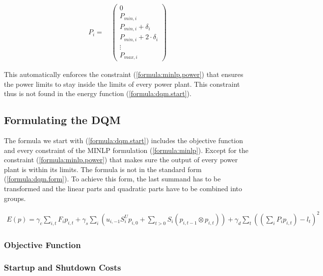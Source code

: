\begin{align}
  P_i =
  \quad \begin{pmatrix}
    0 \\
    P_{min, i} \\
    P_{min, i} + \delta_i \\
    P_{min, i} + 2 \cdot \delta_i \\
    \vdots \\
    P_{max, i}
  \end{pmatrix}
\end{align}

This automatically enforces the constraint (\ref{formula:minlp.power}) that ensures the power limits to stay inside the limits of every power plant.
This constraint thus is not found in the energy function (\ref{formula:dqm.start}).

\subsection{Formulating the DQM}

The formula we start with (\ref{formula:dqm.start}) includes the objective function and every constraint of the MINLP formulation (\ref{formula:minlp}).
Except for the constraint (\ref{formula:minlp.power}) that makes sure the output of every power plant is within its limits.
The formula is not in the standard form (\ref{formula:dqm.form}).
To achieve this form, the last summand has to be transformed and the linear parts and quadratic parts have to be combined into groups.

\begin{align} \label{formula:dqm.start}
  E(p) = \gamma_c \sum_{i, t} F_i p_{i, t}
  + \gamma_s \sum_i \left(
      u_{i, -1} S_i^U p_{i, 0}
      + \sum_{t > 0} S_i \left( p_{i, t-1} \otimes p_{i, t} \right)
    \right)
  + \gamma_d \sum_t \left( \left( \sum_i P_i p_{i, t} \right) - l_t \right) ^2
\end{align}

\subsubsection{Objective Function}


\subsubsection{Startup and Shutdown Costs}

